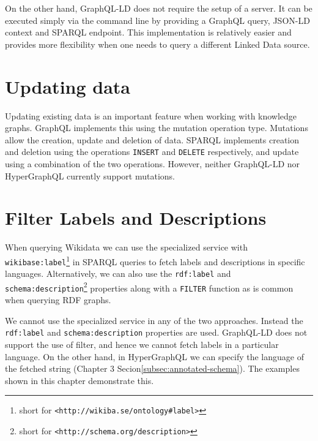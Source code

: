 On the other hand, GraphQL-LD does not require the setup of a server. It can be executed simply via the command line by providing a GraphQL query, JSON-LD context and SPARQL endpoint. This implementation is relatively easier and provides more flexibility when one needs to query a different Linked Data source.



\section{Updating data}
Updating existing data is an important feature when working with knowledge graphs. GraphQL implements this using the mutation operation type. Mutations allow the creation, update and deletion of data. SPARQL implements creation and deletion using the operations \texttt{INSERT} and \texttt{DELETE} respectively, and update using a combination of the two operations. However, neither GraphQL-LD nor HyperGraphQL currently support mutations.  


\section{Filter Labels and Descriptions}
When querying Wikidata we can use the specialized service with \texttt{wikibase:label}\footnote{short for \texttt{<http://wikiba.se/ontology\#label>}} in SPARQL queries to fetch labels and descriptions in specific languages. Alternatively, we can also use the \texttt{rdf:label} and \texttt{schema:description}\footnote{short for \texttt{<http://schema.org/description>}} properties along with a \texttt{FILTER} function as is common when querying RDF graphs. 

We cannot use the specialized service in any of the two approaches. Instead the \texttt{rdf:label} and \texttt{schema:description} properties are used. GraphQL-LD does not support the use of filter, and hence we cannot fetch labels in a particular language. On the other hand, in HyperGraphQL we can specify the language of the fetched string (Chapter 3 Secion\ref{subsec:annotated-schema}). The examples shown in this chapter demonstrate this.

